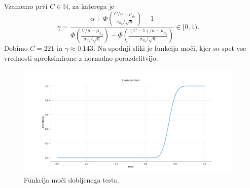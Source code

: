 \documentclass[ letterpaper, titlepage, fleqn]{article}
\newcommand{\N}{\mathbb N}
\begin{document}
Vzamemo prvi $C\in\N$, za katerega je 
$$\gamma = \frac{\alpha +
\Phi\left(\frac{C/n - \mu_{\vartheta_0}}{\sigma_{\vartheta_0} / \sqrt{n}}\right) - 1}
{\Phi\left(\frac{C/n - \mu_{\vartheta_0}}{\sigma_{\vartheta_0} / \sqrt{n}}\right) -
\Phi\left(\frac{(C-1)/n - \mu_{\vartheta_0}}{\sigma_{\vartheta_0} / \sqrt{n}}\right)} \in [0,1).$$
Dobimo $C = 221$ in $\gamma \approx 0.143$. Na spodnji sliki je funkcija moči, kjer so spet vse vrednosti aproksimirane z normalno porazdelitvijo.
\begin{center}
\begin{figure}[h]
\includegraphics[width=18cm]{graphics/FunkcijaMoci.png}
\caption{Funkcija moči dobljenega testa.}
\end{figure}
\end{center}

\section{}
\end{document}
